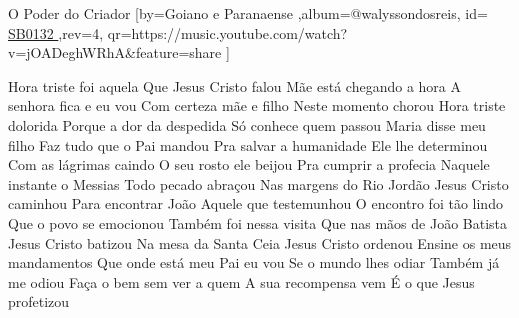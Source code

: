 \beginsong
{O Poder do Criador %
}[by={Goiano e Paranaense %
},album={@walyssondosreis},
id={\href{https://music.youtube.com/watch?v=jOADeghWRhA&feature=share
}{ SB0132 %
}},rev={4}, %
qr={https://music.youtube.com/watch?v=jOADeghWRhA&feature=share %
}]


\beginverse 
 Hora triste foi aquela
Que Jesus Cristo falou
 Mãe está chegando a hora
A senhora fica e eu vou
 Com certeza mãe e filho
Neste momento chorou
 Hora triste dolorida 
Porque a dor da despedida
Só conhece quem passou
\endverse
{}
\beginverse
 Maria disse meu filho 
Faz tudo que o Pai mandou
 Pra salvar a humanidade
Ele lhe determinou
 Com as lágrimas caindo
O seu rosto ele beijou
 Pra cumprir a profecia 
Naquele instante o Messias
Todo pecado abraçou
\endverse
{}
\beginverse
 Nas margens do Rio Jordão
Jesus Cristo caminhou
 Para encontrar João
Aquele que testemunhou
 O encontro foi tão lindo
Que o povo se emocionou
 Também foi nessa visita
Que nas mãos de João Batista
Jesus Cristo batizou
\endverse
{}
\beginverse
 Na mesa da Santa Ceia
Jesus Cristo ordenou
 Ensine os meus mandamentos
Que onde está meu Pai eu vou
 Se o mundo lhes odiar
Também já me odiou
 Faça o bem sem ver a quem 
A sua recompensa vem
É o que Jesus profetizou
\endverse

\vspace{4em} %

\endsong

